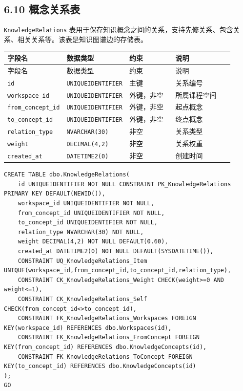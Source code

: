 \documentclass[10pt,a4paper,fontset=none]{ctexart}
\begin{document}
\subsection*{6.10 概念关系表}

\texttt{KnowledgeRelations} 表用于保存知识概念之间的关系，支持先修关系、包含关系、相关关系等。该表是知识图谱边的存储表。\par

\begingroup\scriptsize
\renewcommand{\arraystretch}{1.18}
\setlength{\LTleft}{0pt}
\setlength{\LTright}{0pt}
\begin{longtable}{>{\raggedright\arraybackslash}p{0.20\linewidth}>{\raggedright\arraybackslash}p{0.16\linewidth}>{\raggedright\arraybackslash}p{0.24\linewidth}>{\raggedright\arraybackslash}p{0.32\linewidth}}
\toprule
字段名 & 数据类型 & 约束 & 说明 \\
\midrule
\endfirsthead
\toprule
字段名 & 数据类型 & 约束 & 说明 \\
\midrule
\endhead
\texttt{id} & \texttt{UNIQUEIDENTIFIER} & 主键 & 关系编号 \\
\texttt{workspace\_id} & \texttt{UNIQUEIDENTIFIER} & 外键，非空 & 所属课程空间 \\
\texttt{from\_concept\_id} & \texttt{UNIQUEIDENTIFIER} & 外键，非空 & 起点概念 \\
\texttt{to\_concept\_id} & \texttt{UNIQUEIDENTIFIER} & 外键，非空 & 终点概念 \\
\texttt{relation\_type} & \texttt{NVARCHAR(30)} & 非空 & 关系类型 \\
\texttt{weight} & \texttt{DECIMAL(4,2)} & 非空 & 关系权重 \\
\texttt{created\_at} & \texttt{DATETIME2(0)} & 非空 & 创建时间 \\
\bottomrule
\end{longtable}
\endgroup


\begin{Verbatim}[fontsize=\scriptsize,frame=single]
CREATE TABLE dbo.KnowledgeRelations(
    id UNIQUEIDENTIFIER NOT NULL CONSTRAINT PK_KnowledgeRelations PRIMARY KEY DEFAULT(NEWID()),
    workspace_id UNIQUEIDENTIFIER NOT NULL,
    from_concept_id UNIQUEIDENTIFIER NOT NULL,
    to_concept_id UNIQUEIDENTIFIER NOT NULL,
    relation_type NVARCHAR(30) NOT NULL,
    weight DECIMAL(4,2) NOT NULL DEFAULT(0.60),
    created_at DATETIME2(0) NOT NULL DEFAULT(SYSDATETIME()),
    CONSTRAINT UQ_KnowledgeRelations_Item UNIQUE(workspace_id,from_concept_id,to_concept_id,relation_type),
    CONSTRAINT CK_KnowledgeRelations_Weight CHECK(weight>=0 AND weight<=1),
    CONSTRAINT CK_KnowledgeRelations_Self CHECK(from_concept_id<>to_concept_id),
    CONSTRAINT FK_KnowledgeRelations_Workspaces FOREIGN KEY(workspace_id) REFERENCES dbo.Workspaces(id),
    CONSTRAINT FK_KnowledgeRelations_FromConcept FOREIGN KEY(from_concept_id) REFERENCES dbo.KnowledgeConcepts(id),
    CONSTRAINT FK_KnowledgeRelations_ToConcept FOREIGN KEY(to_concept_id) REFERENCES dbo.KnowledgeConcepts(id)
);
GO
\end{Verbatim}
\end{document}
